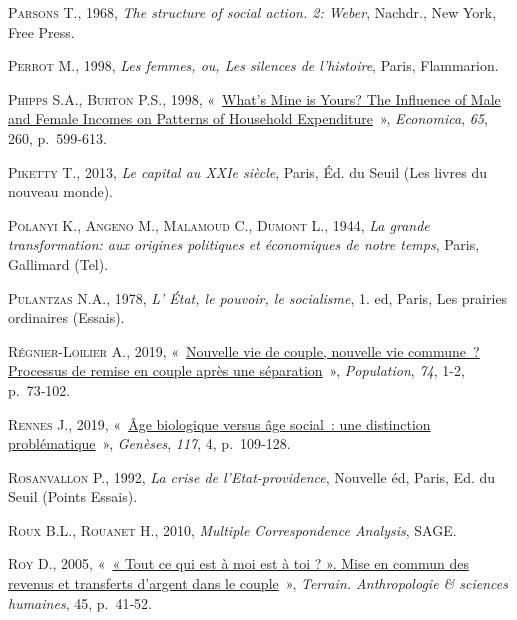 \documentclass[
  12pt,
]{book}
\newlength{\cslhangindent}
\newenvironment{CSLReferences}[2] %
 {\begin{list}{}{%
  \setlength{\itemindent}{0pt}
  \setlength{\leftmargin}{0pt}
  \setlength{\parsep}{0pt}
  \ifodd #1
   \setlength{\leftmargin}{\cslhangindent}
   \setlength{\itemindent}{-1\cslhangindent}
  \fi
  \setlength{\itemsep}{#2\baselineskip}}}
 {\end{list}}
\begin{document}
\begin{CSLReferences}{0}{1}
\textsc{Parsons T.}, 1968, \emph{The structure of social action. 2:
Weber}, Nachdr., New York, Free Press.

\textsc{Perrot M.}, 1998, \emph{Les femmes, ou, Les silences de
l'histoire}, Paris, Flammarion.

\textsc{Phipps S.A.}, \textsc{Burton P.S.}, 1998,
{«~\href{https://doi.org/10.1111/1468-0335.00148}{What{'}s Mine is
Yours? The Influence of Male and Female Incomes on Patterns of Household
Expenditure}~»}, \emph{Economica}, \emph{65}, 260, p.~599‑613.

\textsc{Piketty T.}, 2013, \emph{Le capital au XXIe siècle}, Paris, Éd.
du Seuil (Les livres du nouveau monde).

\textsc{Polanyi K.}, \textsc{Angeno M.}, \textsc{Malamoud C.},
\textsc{Dumont L.}, 1944, \emph{La grande transformation: aux origines
politiques et économiques de notre temps}, Paris, Gallimard (Tel).

\textsc{Pulantzas N.A.}, 1978, \emph{L' État, le pouvoir, le
socialisme}, 1. ed, Paris, Les prairies ordinaires (Essais).

\textsc{Régnier-Loilier A.}, 2019,
{«~\href{https://doi.org/10.3917/popu.1901.0073}{Nouvelle vie de couple,
nouvelle vie commune~? Processus de remise en couple après une
séparation}~»}, \emph{Population}, \emph{74}, 1-2, p.~73‑102.

\textsc{Rennes J.}, 2019,
{«~\href{https://doi.org/10.3917/gen.117.0109}{Âge biologique versus âge
social~: une distinction problématique}~»}, \emph{Genèses}, \emph{117},
4, p.~109‑128.

\textsc{Rosanvallon P.}, 1992, \emph{La crise de l'Etat-providence},
Nouvelle éd, Paris, Ed. du Seuil (Points Essais).

\textsc{Roux B.L.}, \textsc{Rouanet H.}, 2010, \emph{Multiple
Correspondence Analysis}, SAGE.

\textsc{Roy D.}, 2005, {«~\href{https://doi.org/10.4000/terrain.3530}{«
Tout ce qui est à moi est à toi ? ». Mise en commun des revenus et
transferts d{'}argent dans le couple}~»}, \emph{Terrain. Anthropologie
\& sciences humaines}, 45, p.~41‑52.


\end{CSLReferences}
\end{document}
